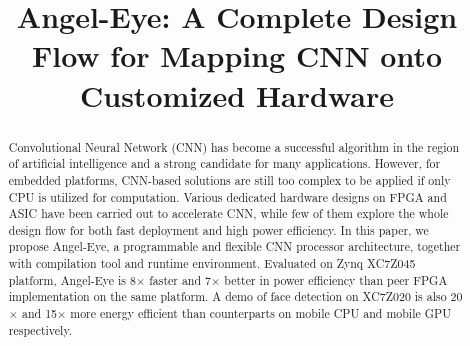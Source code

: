 \documentclass[10pt, conference, compsocconf]{IEEEtran}
\begin{document}
    \captionsetup{singlelinecheck=on}

\title{Angel-Eye: A Complete Design Flow for Mapping CNN onto Customized Hardware}

\author{
}


\maketitle
\begin{abstract}
Convolutional Neural Network (CNN) has become a successful algorithm in the region of artificial intelligence and a strong candidate for many applications. However, for embedded platforms, CNN-based solutions are still too complex to be applied if only CPU is utilized for computation. Various dedicated hardware designs on FPGA and ASIC have been carried out to accelerate CNN, while few of them explore the whole design flow for both fast deployment and high power efficiency. In this paper, we propose Angel-Eye, a programmable and flexible CNN processor architecture, together with compilation tool and runtime environment. Evaluated on Zynq XC7Z045 platform, Angel-Eye is 8$\times$ faster and 7$\times$ better in power efficiency than peer FPGA implementation on the same platform. A demo of face detection on XC7Z020 is also 20$\times$ and 15$\times$ more energy efficient than counterparts on mobile CPU and mobile GPU respectively.

\end{abstract}
\end{document}
